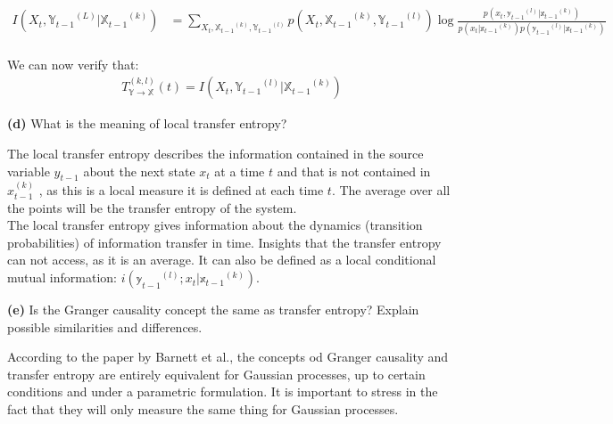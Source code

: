 \documentclass[11pt]{article}
\makeatletter
\newenvironment{proofw}{\par
	\pushQED{\qed}%
	\normalfont \topsep6\p@\@plus6\p@\relax
	\trivlist
	\item[]\ignorespaces
}{%
	\popQED\endtrivlist\@endpefalse
}
\makeatother
\begin{document}
\begin{proofw}
\begin{equation*}\label{mutual_information}
\begin{split}
I(X_{t}, {\mathbb{Y}_{t-1}}^{(L)}|{\mathbb{X}_{t-1}}^{(k)}) &= \sum_{X_{t}, {\mathbb{X}_{t-1}}^{(k)},{\mathbb{Y}_{t-1}}^{(l)}} p({X_{t}, {\mathbb{X}_{t-1}}^{(k)},{\mathbb{Y}_{t-1}}^{(l)}}) \log\frac{p(x_{t}, {\mathbb{y}_{t-1}}^{(l)}|{\mathbb{x}_{t-1}}^{(k)})}{p(x_{t}|{\mathbb{x}_{t-1}}^{(k)}) p({\mathbb{y}_{t-1}}^{(l)}|{\mathbb{x}_{t-1}}^{(k)})}\\
\end{split}
\end{equation*}

We can now verify that:
\begin{equation*}
\begin{split}
{T}^{(k,l)}_{\mathbb{Y}\rightarrow \mathbb{X}}(t)  = I(X_{t}, {\mathbb{Y}_{t-1}}^{(l)}|{\mathbb{X}_{t-1}}^{(k)}) 
\end{split}
\end{equation*}
\end{proofw}
\begin{tcolorbox}
\textbf{(d)}
What is the meaning of local transfer entropy?
\end{tcolorbox}

The local transfer entropy describes the information contained in the source variable $y_{t-1}$ about the next state $x_{t}$ at a time $t$ and that is not contained in ${x}^{(k)}_{t-1}$ , as this is a local measure it is defined at each time $t$. The average over all the points will be the transfer entropy of the system. \\

The local transfer entropy gives information about the dynamics (transition probabilities) of information transfer in time. Insights that the transfer entropy can not access, as it is an average. It can also be defined as a local conditional mutual information: $i( {\mathbb{y}_{t-1}}^{(l)};x_{t}|{\mathbb{x}_{t-1}}^{(k)})$.\\

\begin{tcolorbox}
\textbf{(e)}
Is the Granger causality concept the same as transfer entropy?
Explain possible similarities and differences.
\end{tcolorbox}
According to the paper by Barnett et al., the concepts od Granger causality and transfer entropy are entirely equivalent for Gaussian processes, up to certain conditions and under a parametric formulation. It is important to stress in the fact that they will only measure the same thing for Gaussian processes. \\
\end{document}
